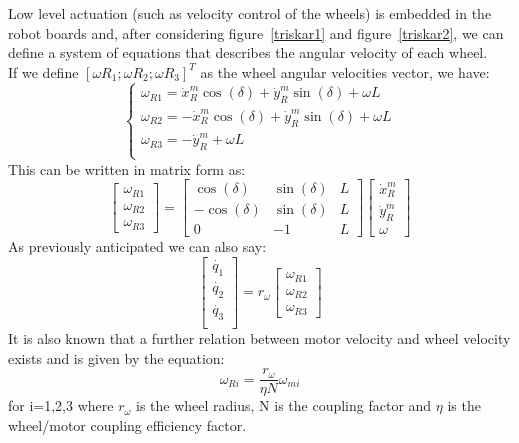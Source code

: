 Low level actuation (such as velocity control of the wheels) is embedded in the robot boards and, after considering figure~\ref{triskar1} and figure~\ref{triskar2}, we can define a system of equations that describes the angular velocity of each wheel.\\	
If we define $[\omega R_1; \omega R_2; \omega R_3]^T$ as the wheel angular velocities vector, we have:
\begin{equation}
\begin{cases} 

\omega_{R1} = \dot{x}^m_R\cos(\delta)+\dot{y}^m_R\sin(\delta)+ \omega L\\ 
\omega_{R2} = -\dot{x}^m_R\cos(\delta)+\dot{y}^m_R\sin(\delta)+\omega L\\ 
\omega_{R3} = -\dot{y}^m_R +  \omega L \\ 
\end{cases} 
\end{equation}
This can be written in matrix form as:
\begin{equation}
\begin{bmatrix}
\omega_{R1}\\
\omega_{R2}\\
\omega_{R3}
\end{bmatrix} = 
\begin{bmatrix}
\cos(\delta) & \sin(\delta) & L \\
-\cos(\delta) & \sin(\delta) & L \\
0 & -1 & L
\end{bmatrix}
\begin{bmatrix}
\dot{x}^m_R\\
\dot{y}^m_R\\
\omega
\end{bmatrix}
\end{equation} 
As previously anticipated we can also say:
\begin{equation}
\begin{bmatrix}
\dot{q_1}\\
\dot{q_2}\\
\dot{q_3}\\
\end{bmatrix} = 
r_\omega
\begin{bmatrix}
\omega_{R1}\\
\omega_{R2}\\
\omega_{R3}
\end{bmatrix}
\end{equation}
It is also known that a further relation between motor velocity and wheel velocity exists and is given by the equation:
\begin{equation}
\omega_{Ri}=\frac{r_\omega}{\eta N}\omega_{mi}
\end{equation}
for i=1,2,3 where $r_\omega$ is the wheel radius, N is the coupling factor and $\eta$ is the wheel/motor coupling efficiency factor.

